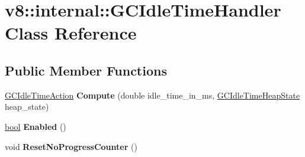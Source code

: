 \hypertarget{classv8_1_1internal_1_1GCIdleTimeHandler}{}\section{v8\+:\+:internal\+:\+:G\+C\+Idle\+Time\+Handler Class Reference}
\label{classv8_1_1internal_1_1GCIdleTimeHandler}
\subsection*{Public Member Functions}
\begin{DoxyCompactItemize}
\item 
\mbox{\label{classv8_1_1internal_1_1GCIdleTimeHandler_a598bc79c7b3083e2e123827ed3feef57}} 
\mbox{\hyperlink{classv8_1_1internal_1_1GCIdleTimeAction}{G\+C\+Idle\+Time\+Action}} {\bfseries Compute} (double idle\+\_\+time\+\_\+in\+\_\+ms, \mbox{\hyperlink{classv8_1_1internal_1_1GCIdleTimeHeapState}{G\+C\+Idle\+Time\+Heap\+State}} heap\+\_\+state)
\item 
\mbox{\label{classv8_1_1internal_1_1GCIdleTimeHandler_a48b5ffc243a7e6d1adcbcd6808d57d3f}} 
\mbox{\hyperlink{classbool}{bool}} {\bfseries Enabled} ()
\item 
\mbox{\label{classv8_1_1internal_1_1GCIdleTimeHandler_a0ced27dfff862c837bf24895c71cc545}} 
void {\bfseries Reset\+No\+Progress\+Counter} ()
\end{DoxyCompactItemize}
